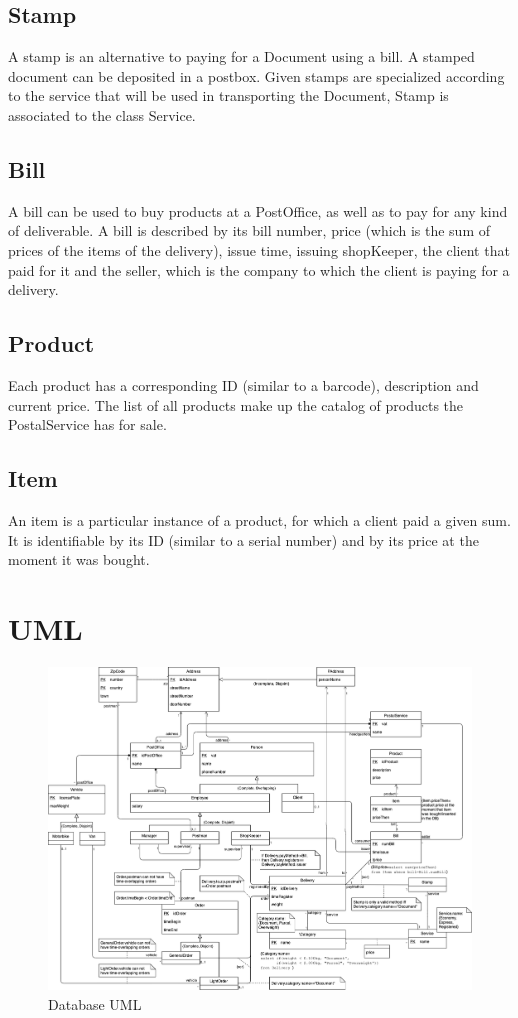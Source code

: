 \documentclass{article}[a4paper]
\theoremstyle{remark}
\begin{document}
\subsection{Stamp}
A stamp is an alternative to paying for a Document using a bill. A stamped document can be deposited in a postbox. Given stamps are specialized according to the service that will be used in transporting the Document, Stamp is associated to the class Service.
\subsection{Bill}
A bill can be used to buy products at a PostOffice, as well as to pay for any kind of deliverable. A bill is described by its bill number, price (which is the sum of prices of the items of the delivery), issue time, issuing shopKeeper, the client that paid for it and the seller, which is the company to which the client is paying for a delivery.
\subsection{Product}
Each product has a corresponding ID (similar to a barcode), description and current price. The list of all products make up the catalog of products the PostalService has for sale.
\subsection{Item}
An item is a particular instance of a product, for which a client paid a given sum. It is identifiable by its ID (similar to a serial number) and by its price at the moment it was bought.
\section{UML}
\begin{figure}[H] \centering
	\includegraphics[angle=-90,scale=0.397]{uml}
	\caption{Database UML}
\end{figure}
\end{document}
